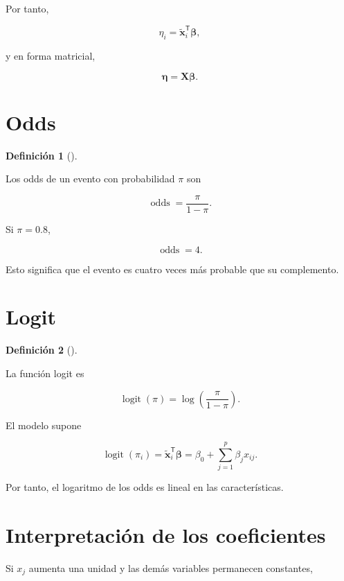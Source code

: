 \documentclass[
  spanish,
  11pt,
  letterpaper,
  DIV=11,
  numbers=noendperiod]{scrreprt}
\theoremstyle{definition}
\newtheorem{definition}{Definición}[chapter]
\theoremstyle{plain}
\theoremstyle{definition}
\theoremstyle{remark}
\begin{document}
Por tanto,

\[
\eta_i
=
\widetilde{\mathbf{x}}_i^{\mathsf T}
\boldsymbol{\beta},
\]

y en forma matricial,

\[
\boldsymbol{\eta}
=
\mathbf{X}\boldsymbol{\beta}.
\]

\section{Odds}\label{odds}

\begin{definition}[]\protect\hypertarget{def-odds}{}\label{def-odds}

Los odds de un evento con probabilidad \(\pi\) son

\[
\operatorname{odds}
=
\frac{\pi}{1-\pi}.
\]

\end{definition}

Si \(\pi=0.8\),

\[
\operatorname{odds}=4.
\]

Esto significa que el evento es cuatro veces más probable que su
complemento.

\section{Logit}\label{logit}

\begin{definition}[]\protect\hypertarget{def-logit}{}\label{def-logit}

La función logit es

\[
\operatorname{logit}(\pi)
=
\log\left(\frac{\pi}{1-\pi}\right).
\]

\end{definition}

El modelo supone

\[
\operatorname{logit}(\pi_i)
=
\widetilde{\mathbf{x}}_i^{\mathsf T}
\boldsymbol{\beta}
=
\beta_0+
\sum_{j=1}^{p}\beta_j x_{ij}.
\]

Por tanto, el logaritmo de los odds es lineal en las características.

\section{Interpretación de los
coeficientes}\label{interpretaciuxf3n-de-los-coeficientes-1}

Si \(x_j\) aumenta una unidad y las demás variables permanecen
constantes,
\end{document}
